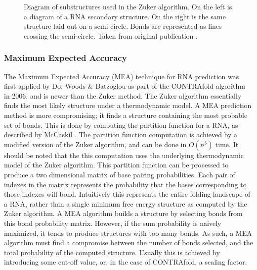 \documentclass[12pt, a4paper]{article}
\begin{document}
\begin{figure}
\begin{center}
\end{center}
\caption{Diagram of substructures used in the Zuker algorithm. On the left is a diagram of a RNA secondary structure. On the right is the same structure laid out on a semi-circle. Bonds are represented as lines crossing the semi-circle. Taken from original
publication \cite{zuker1981optimal}.}
\label{fig:zuk_struct}
\end{figure}

\subsubsection{Maximum Expected Accuracy}
The Maximum Expected Accuracy (MEA) technique for RNA prediction was first applied by Do, Woods \& Batzoglou as part of the CONTRAfold algorithm \cite{do2006contrafold} in 2006, and is newer than the Zuker method. The Zuker algorithm essentially finds the most likely structure under a thermodynamic model. A MEA prediction method is more compromising; it finds a structure containing the most probable set of bonds. This is done by computing the partition function for a RNA, as described by McCaskil \cite{mccaskill1990equilibrium}. The partition function computation is achieved by a modified version of the Zuker algorithm, and can be done in $O(n^3)$ time. It should be noted that the this computation uses the underlying thermodynamic model of the Zuker algorithm. This partition function can be processed to produce a two dimensional matrix of base pairing probabilities. Each pair of indexes in the matrix represents the probability that the bases corresponding to those indexes will bond. Intuitively this represents the entire folding landscape of a RNA, rather than a single minimum free energy structure as computed by the Zuker algorithm. A MEA algorithm builds a structure by selecting bonds from this bond probability matrix. However, if the sum probability is naively maximized, it tends to produce structures with too many bonds. As such, a MEA algorithm must find a compromise between the number of bonds selected, and the total probability of the computed structure. Usually this is achieved by introducing some cut-off value, or, in the case of CONTRAfold, a scaling factor.
\end{document}
